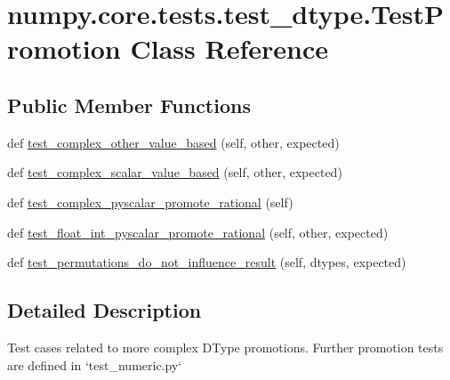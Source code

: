 \hypertarget{classnumpy_1_1core_1_1tests_1_1test__dtype_1_1TestPromotion}{}\section{numpy.\+core.\+tests.\+test\+\_\+dtype.\+Test\+Promotion Class Reference}
\label{classnumpy_1_1core_1_1tests_1_1test__dtype_1_1TestPromotion}
\subsection*{Public Member Functions}
\begin{DoxyCompactItemize}
\item 
def \hyperlink{classnumpy_1_1core_1_1tests_1_1test__dtype_1_1TestPromotion_a1d9c03aec789a36e07c383601bbd288e}{test\+\_\+complex\+\_\+other\+\_\+value\+\_\+based} (self, other, expected)
\item 
def \hyperlink{classnumpy_1_1core_1_1tests_1_1test__dtype_1_1TestPromotion_ab88e4c0eacee2094997a1d7d00df7752}{test\+\_\+complex\+\_\+scalar\+\_\+value\+\_\+based} (self, other, expected)
\item 
def \hyperlink{classnumpy_1_1core_1_1tests_1_1test__dtype_1_1TestPromotion_ae890d8847d57f994777157e8ed31b957}{test\+\_\+complex\+\_\+pyscalar\+\_\+promote\+\_\+rational} (self)
\item 
def \hyperlink{classnumpy_1_1core_1_1tests_1_1test__dtype_1_1TestPromotion_a603ba7066627103f408b530c6b47b184}{test\+\_\+float\+\_\+int\+\_\+pyscalar\+\_\+promote\+\_\+rational} (self, other, expected)
\item 
def \hyperlink{classnumpy_1_1core_1_1tests_1_1test__dtype_1_1TestPromotion_a0116e32c45cc0c16d72d79af4d2e4cca}{test\+\_\+permutations\+\_\+do\+\_\+not\+\_\+influence\+\_\+result} (self, dtypes, expected)
\end{DoxyCompactItemize}


\subsection{Detailed Description}
\begin{DoxyVerb}Test cases related to more complex DType promotions.  Further promotion
tests are defined in `test_numeric.py`
\end{DoxyVerb}
 

